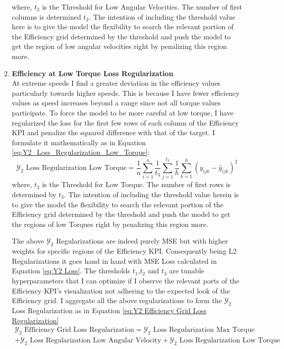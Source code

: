 \documentclass{report} %
\begin{document}
\begin{enumerate}
\begin{enumerate}
\begin{equation}
    \label{eq:Y2_Loss_Regularization_Low_Speed}
\end{equation}
where, \(t_{2}\) is the Threshold for Low Angular Velocities. The number of first columns is determined $t_{2}$. 
The intention of including the threshold value here is to give the model the flexibility to search the relevant portion of the Efficiency grid determined by the threshold 
and push the model to get the region of low angular velocities right by penalizing this region more.
\item \textbf{Efficiency at Low Torque Loss Regularization} \\
At extreme speeds I find a greater deviation in the efficiency values particularly towards higher speeds. This is because I have fewer efficiency values as speed 
increases beyond a range since not all torque values participate.
To force the model to be more careful at low torque, I have regularized the loss for the first few rows of each column of the Efficiency \ac{KPI} and penalize the 
squared difference with that of the target. 
I formulate it mathematically as in Equation \ref{eq:Y2_Loss_Regularization_Low_Torque}:
\begin{equation}
    \text{$\mathcal{Y}_2$ Loss Regularization Low Torque} = \frac{1}{n} \sum_{i=1}^{n} \frac{1}{t_{3}} \sum_{j=1}^{t_{3}} \frac{1}{h} \sum_{k=1}^{h} (y_{ijk} - \hat{y}_{ijk})^2
    \label{eq:Y2_Loss_Regularization_Low_Torque}
\end{equation}
where, \(t_{3}\) is the Threshold for Low Torque. The number of first rows is determined by $t_{3}$.
The intention of including the threshold value herein is to give the model the flexibility to search the relevant portion of the Efficiency grid determined by the threshold 
and push the model to get the regions of low Torques right by penalizing this region more.

The above $\mathcal{Y}_2$ Regularizations are indeed purely \ac{MSE} but with higher weights for specific regions of the Efficiency \ac{KPI}.
Consequently being L2 Regularizations it goes hand in hand with \ac{MSE} Loss calculated in Equation \ref{eq:Y2 Loss}.
The thresholds \(t_{1}\),\(t_{2}\) and \(t_{3}\) are tunable hyperparameters that I can optimize if I observe the relevant ports of the Efficiency \ac{KPI}'s visualization 
not adhering to the expected look of the Efficiency grid.
I aggregate all the above regularizations to form the $\mathcal{Y}_2$ Loss Regularization as in Equation \ref{eq:Y2 Efficiency Grid Loss Regularization}
\begin{equation}
    \begin{split}
    \text{$\mathcal{Y}_2$ Efficiency Grid Loss Regularization} = \text{$\mathcal{Y}_2$ Loss Regularization Max Torque} \\
    + \text{$\mathcal{Y}_2$ Loss Regularization Low Angular Velocity} + \text{$\mathcal{Y}_2$ Loss Regularization Low Torque}
    \end{split}
    \label{eq:Y2 Efficiency Grid Loss Regularization}
\end{equation}
\end{enumerate}
\end{enumerate}
\end{document}
